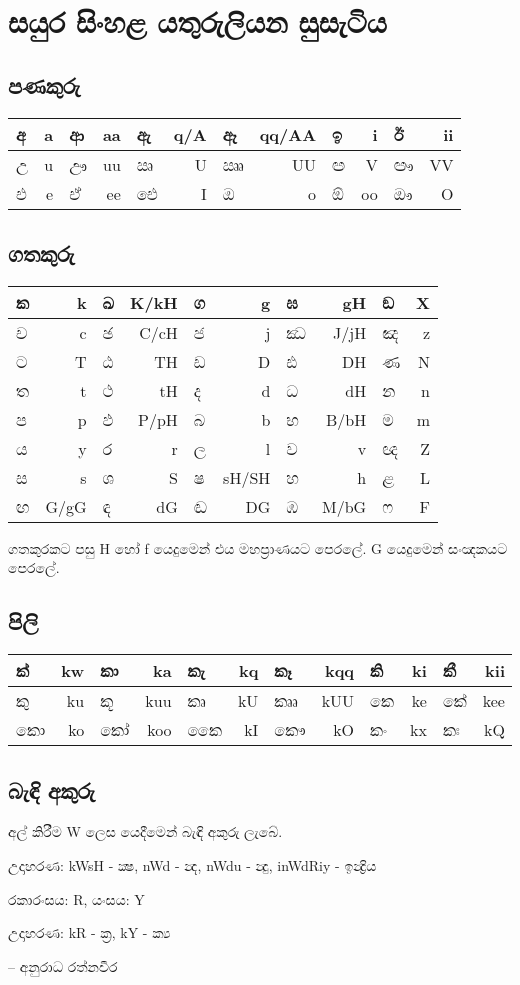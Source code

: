 \documentclass[a4paper,12pt]{article}
\begin{document}
\section*{සයුර සිංහළ යතුරුලියන සුසැටිය}
\subsection*{පණකුරු}

\begin{tabular}{|lr|lr|lr|lr|lr|lr|}
\hline
අ & a & ආ & aa & ඇ & q/A & ඈ & qq/AA & ඉ & i & ඊ & ii \\
\hline
උ & u & ඌ & uu & ඍ & U & ඎ & UU & ඏ & V & ඐ & VV \\
\hline
එ & e & ඒ & ee & ඓ & I & ඔ & o & ඕ & oo & ඖ & O \\
\hline
\end{tabular}

\subsection*{ගතකුරු}

\begin{tabular}{|lr|lr|lr|lr|lr|}
\hline
ක & k & ඛ & K/kH & ග & g & ඝ & gH & ඞ & X \\
\hline
ච & c & ඡ & C/cH & ජ & j & ඣ & J/jH & ඤ & z \\
\hline
ට & T & ඨ & TH & ඩ & D & ඪ & DH & ණ & N \\
\hline
ත & t & ථ & tH & ද & d & ධ & dH & න & n \\
\hline
ප & p & ඵ & P/pH & බ & b & භ & B/bH & ම & m \\
\hline
ය & y & ර & r & ල & l & ව & v &  ඥ & Z \\
\hline
ස & s & ශ & S & ෂ & sH/SH & හ & h & ළ & L \\
\hline
ඟ & G/gG & ඳ & dG & ඬ & DG & ඹ & M/bG & ෆ & F \\
\hline
\end{tabular}

ගතකුරකට පසු H හෝ f යෙදුමෙන් එය මහප්‍රාණයට පෙරලේ. G යෙදුමෙන් සංඤකයට පෙරලේ.

\subsection*{පිලි}

\begin{tabular}{|lr|lr|lr|lr|lr|lr|}
\hline
ක් & kw & කා & ka & කැ & kq & කෑ & kqq & කි & ki & කී & kii \\
\hline
කු & ku & කූ & kuu & කෘ & kU & කෲ & kUU & කෙ & ke & කේ & kee \\
\hline
කො & ko & කෝ & koo & කෛ & kI & කෞ & kO & කං & kx & කඃ & kQ \\
\hline
\end{tabular}

\subsection*{බැඳි අකුරු}

අල් කිරීම W ලෙස යෙදීමෙන් බැඳි අකුරු ලැබේ.

උදාහරණ: kWsH - ක්‍ෂ, nWd - න්‍ද, nWdu - න්‍දු, inWdRiy - ඉන්‍ද්‍රිය

\medskip

රකාරංසය: R, යංසය: Y

උදාහරණ: kR - ක්‍ර, kY - ක්‍ය

\bigskip
\bigskip
\bigskip

-- අනුරාධ රත්නවීර
\end{document}
